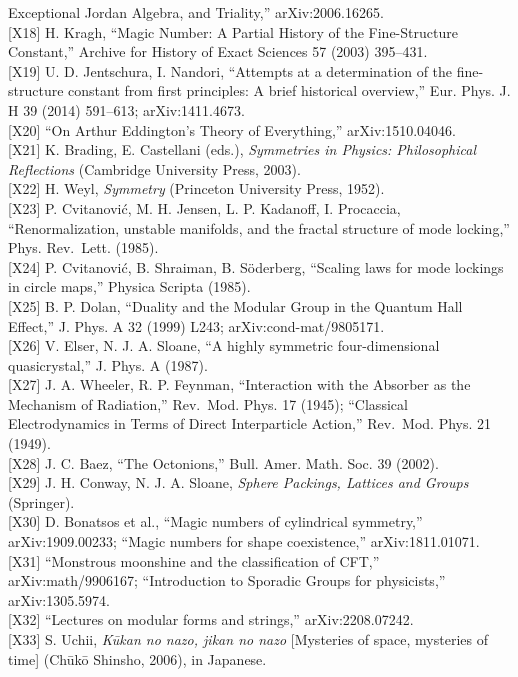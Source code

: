\documentclass[
  a4paper,
]{article}
\begin{document}
Exceptional Jordan Algebra, and Triality,'' arXiv:2006.16265.\\
{[}X18{]} H. Kragh, ``Magic Number: A Partial History of the
Fine-Structure Constant,'' Archive for History of Exact Sciences 57
(2003) 395--431.\\
{[}X19{]} U. D. Jentschura, I. Nandori, ``Attempts at a determination of
the fine-structure constant from first principles: A brief historical
overview,'' Eur. Phys. J. H 39 (2014) 591--613; arXiv:1411.4673.\\
{[}X20{]} ``On Arthur Eddington's Theory of Everything,''
arXiv:1510.04046.\\
{[}X21{]} K. Brading, E. Castellani (eds.), \emph{Symmetries in Physics:
Philosophical Reflections} (Cambridge University Press, 2003).\\
{[}X22{]} H. Weyl, \emph{Symmetry} (Princeton University Press, 1952).\\
{[}X23{]} P. Cvitanović, M. H. Jensen, L. P. Kadanoff, I. Procaccia,
``Renormalization, unstable manifolds, and the fractal structure of mode
locking,'' Phys. Rev.~Lett. (1985).\\
{[}X24{]} P. Cvitanović, B. Shraiman, B. Söderberg, ``Scaling laws for
mode lockings in circle maps,'' Physica Scripta (1985).\\
{[}X25{]} B. P. Dolan, ``Duality and the Modular Group in the Quantum
Hall Effect,'' J. Phys. A 32 (1999) L243; arXiv:cond-mat/9805171.\\
{[}X26{]} V. Elser, N. J. A. Sloane, ``A highly symmetric
four-dimensional quasicrystal,'' J. Phys. A (1987).\\
{[}X27{]} J. A. Wheeler, R. P. Feynman, ``Interaction with the Absorber
as the Mechanism of Radiation,'' Rev.~Mod. Phys. 17 (1945); ``Classical
Electrodynamics in Terms of Direct Interparticle Action,'' Rev.~Mod.
Phys. 21 (1949).\\
{[}X28{]} J. C. Baez, ``The Octonions,'' Bull. Amer. Math. Soc. 39
(2002).\\
{[}X29{]} J. H. Conway, N. J. A. Sloane, \emph{Sphere Packings, Lattices
and Groups} (Springer).\\
{[}X30{]} D. Bonatsos et al., ``Magic numbers of cylindrical symmetry,''
arXiv:1909.00233; ``Magic numbers for shape coexistence,''
arXiv:1811.01071.\\
{[}X31{]} ``Monstrous moonshine and the classification of CFT,''
arXiv:math/9906167; ``Introduction to Sporadic Groups for physicists,''
arXiv:1305.5974.\\
{[}X32{]} ``Lectures on modular forms and strings,'' arXiv:2208.07242.\\
{[}X33{]} S. Uchii, \emph{Kūkan no nazo, jikan no nazo} {[}Mysteries of
space, mysteries of time{]} (Chūkō Shinsho, 2006), in Japanese.
\end{document}

